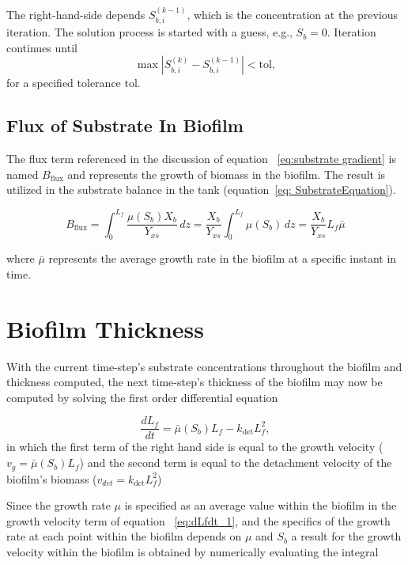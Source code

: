 \documentclass[letterpaper, twoside]{article}
\numberwithin{equation}{section}
\begin{document}
The right-hand-side depends $S_{b,i}^{(k-1)}$, which is the concentration at the previous iteration.  The solution process is started with a guess, e.g., $S_b=0$. Iteration continues until
\begin{equation*}
  \max\left| S_{b,i}^{(k)} - S_{b,i}^{(k-1)} \right| < \mathrm{tol},
\end{equation*}
for a specified tolerance $\mathrm{tol}$.

\subsection{Flux of Substrate In Biofilm}
The flux term referenced in the discussion of equation ~\ref{eq:substrate gradient} is named $B_\mathrm{flux}$ and represents the growth of biomass in the biofilm. The result is utilized in the substrate balance in the tank (equation~\ref{eq: SubstrateEquation}).

\begin{equation} \label{eq:Bflux}
  B_\mathrm{flux} = \int_0^{L_f} \frac{\mu(S_b) X_b}{Y_{xs}} \, dz = \frac{ X_b}{Y_{xs}}\int_0^{L_f} \mu(S_b) \, dz = \frac{ X_b}{Y_{xs}} L_f \bar{\mu}
\end{equation}

where $\bar{\mu}$ represents the average growth rate in the biofilm at a specific instant in time.

\section{Biofilm Thickness}
With the current time-step's substrate concentrations throughout the biofilm and thickness computed, the next time-step's thickness of the biofilm may now be computed by solving the first order differential equation

\begin{equation}
  \label{eq:dLfdt_1}
  \frac{d L_f}{dt} = {\bar\mu(S_b) L_f}-{k_{\mathrm{det}}L_f^2},
\end{equation}
in which the first term of the right hand side is equal to the growth velocity ($v_g={\bar\mu(S_b) L_f}$) and the second term is equal to the detachment velocity of the biofilm's biomass ($v_{det}={k_{\mathrm{det}}L_f^2}$)

Since the growth rate $\mu$ is specified as an average value within the biofilm in the growth velocity term of equation ~\ref{eq:dLfdt_1}, and the specifics of the growth rate at each point within the biofilm depends on $\mu$ and $S_b$ a result for the growth velocity within the biofilm is obtained by numerically evaluating the integral 
\end{document}
